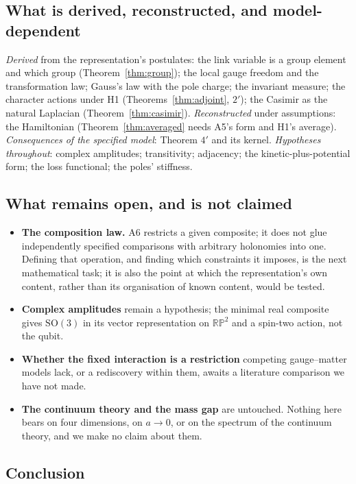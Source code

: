 \documentclass[11pt,a4paper]{article}
\theoremstyle{plain}
\theoremstyle{definition}
\theoremstyle{remark}
\newcommand{\RP}{\mathbb{RP}}
\newcommand{\SO}{\mathrm{SO}}
\begin{document}
\subsection{What is derived, reconstructed, and model-dependent}

\emph{Derived} from the representation's postulates: the link variable is a group element and which group (Theorem~\ref{thm:group}); the local gauge freedom and the transformation law; Gauss's law with the pole charge; the invariant measure; the character actions under H1 (Theorems~\ref{thm:adjoint}, $2'$); the Casimir as the natural Laplacian (Theorem~\ref{thm:casimir}). \emph{Reconstructed} under assumptions: the Hamiltonian (Theorem~\ref{thm:averaged} needs A5's form and H1's average). \emph{Consequences of the specified model}: Theorem $4'$ and its kernel. \emph{Hypotheses throughout}: complex amplitudes; transitivity; adjacency; the kinetic-plus-potential form; the loss functional; the poles' stiffness.

\subsection{What remains open, and is not claimed}

\begin{itemize}[leftmargin=1.5em]
\item \textbf{The composition law.} A6 restricts a given composite; it does not glue independently specified comparisons with arbitrary holonomies into one. Defining that operation, and finding which constraints it imposes, is the next mathematical task; it is also the point at which the representation's own content, rather than its organisation of known content, would be tested.
\item \textbf{Complex amplitudes} remain a hypothesis; the minimal real composite gives $\SO(3)$ in its vector representation on $\RP^2$ and a spin-two action, not the qubit.
\item \textbf{Whether the fixed interaction is a restriction} competing gauge--matter models lack, or a rediscovery within them, awaits a literature comparison we have not made.
\item \textbf{The continuum theory and the mass gap} are untouched. Nothing here bears on four dimensions, on $a\to0$, or on the spectrum of the continuum theory, and we make no claim about them.
\end{itemize}

\subsection{Conclusion}
\end{document}
